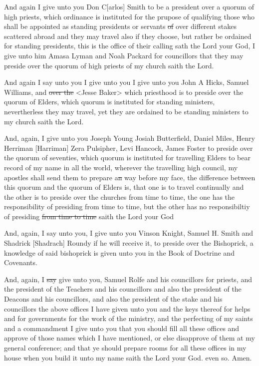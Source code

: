 				And again I give unto you Don C[arlos] Smith to be a president over a quorum of high priests, which ordinance is instituted for the prupose of qualifying those who shall be appointed as standing presidents or servants \sout{of} over different stakes scattered abroad and they may travel also if they choose, but rather be ordained for standing presidents, this is the office of their calling sath the Lord your God, I give unto him Amasa Lyman and Noah Packard for councillors that they may preside over the quorum of high priests of my church saith the Lord.

				And again I say unto you I give unto you I give unto you John A Hicks, Samuel Williams, and \sout{over the} <Jesse Baker> which priesthood is to preside over the quorum of Elders, which quorum is instituted for standing ministers, nevertherless they may travel, yet they are ordained to be standing ministers to my church saith the Lord.

				And, again, I give unto you Joseph Young Josiah Butterfield, Daniel Miles, Henry Herriman [Harriman] Zera Pulsipher, Levi Hancock, James Foster to preside over the quorum of seventies, which quorum is instituted for travelling Elders to bear record of my name in all the world, wherever the travelling high council, my apostles shall send them to prepare a\sout{n} way before my face, the difference between this quorum and the quorum of Elders is, that one is to travel continually and the other is to preside over the churches from time to time, the one has the responsibility of presiding from time to time, but the other has no responsibiltiy of presiding \sout{from time to time} saith the Lord your God

				And, again, I say unto you, I give unto you Vinson Knight, Samuel H. Smith and Shadrick [Shadrach] Roundy if he will receive it, to preside over the Bishoprick, a knowledge of said bishoprick is given unto you in the Book of Doctrine and Covenants.

				And, again, I \sout{say} give unto you, Samuel Rolfe and his councillors for priests, and the president of the Teachers and his councillors and also the president of the Deacons and his councillors, and also the president of the stake and his councillors the above offices I have given unto you and the keys thereof for helps and for governments for the work of the ministry, and the perfecting of my saints and a commandment I give unto you that you should fill all these offices and approve of those names which I have mentioned, or else disapprove of them at my general conference; and that ye should prepare rooms for all these offices in my house when you build it unto my name saith the Lord your God. even so. Amen.
				
